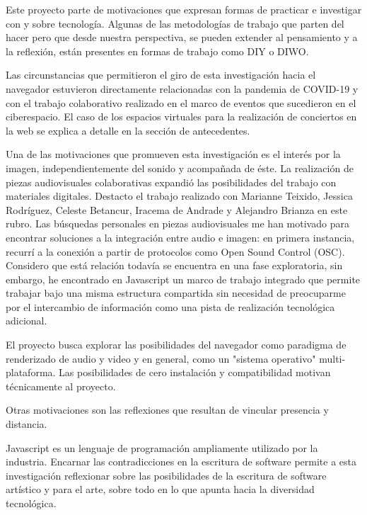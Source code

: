 Este proyecto parte de motivaciones que expresan formas de practicar e investigar con y sobre tecnología. Algunas de las metodologías de trabajo que parten del hacer pero que desde nuestra perspectiva, se pueden extender al pensamiento y a la reflexión, están presentes en formas de trabajo como DIY o DIWO.

Las circunstancias que permitieron el giro de esta investigación hacia el navegador estuvieron directamente relacionadas con la pandemia de COVID-19 y con el trabajo colaborativo realizado en el marco de eventos que sucedieron en el ciberespacio. El caso de los espacios virtuales para la realización de conciertos en la web se explica a detalle en la sección de antecedentes. 

Una de las motivaciones que promueven esta investigación es el interés por la imagen, independientemente del sonido y acompañada de éste. La realización de piezas audiovisuales colaborativas expandió las posibilidades del trabajo con materiales digitales. Destacto el trabajo realizado con Marianne Teixido, Jessica Rodríguez, Celeste Betancur, Iracema de Andrade y Alejandro Brianza en este rubro. Las búsquedas personales en piezas audiovisuales me han motivado para encontrar soluciones a la integración entre audio e imagen: en primera instancia, recurrí a la conexión a partir de protocolos como Open Sound Control (\Gls{OSC}). Considero que está relación todavía se encuentra en una fase exploratoria, sin embargo, he encontrado en Javascript un marco de trabajo integrado que permite trabajar bajo una misma estructura compartida sin necesidad de preocuparme por el intercambio de información como una pista de realización tecnológica adicional.  


El proyecto busca explorar las posibilidades del navegador como paradigma de renderizado de audio y video y en general, como un "sistema operativo" multi-plataforma. Las posibilidades de cero instalación y compatibilidad motivan técnicamente al proyecto.

Otras motivaciones son las reflexiones que resultan de vincular presencia y distancia.

Javascript es un lenguaje de programación ampliamente utilizado por la industria. Encarnar las contradicciones en la escritura de software permite a esta investigación reflexionar sobre las posibilidades de la escritura de software artístico y para el arte, sobre todo en lo que apunta hacia la diversidad tecnológica.

